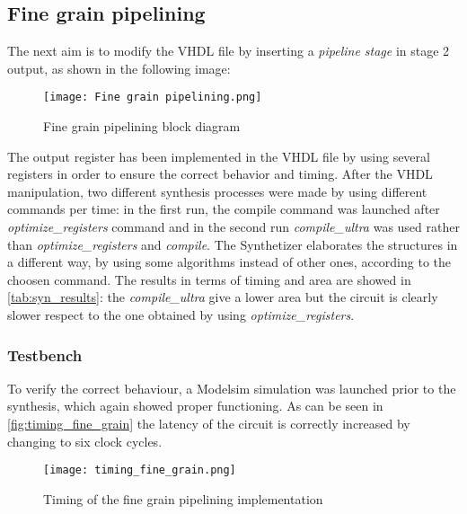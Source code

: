 
\subsection{Fine grain pipelining}
The next aim is to modify the VHDL file by inserting a \textit{pipeline stage} in stage 2 output, as shown in the following image:
\begin{figure}[htb]
	\center
	\texttt{[image: Fine grain pipelining.png]}
	\caption{Fine grain pipelining block diagram}
	\label{fig:fine_pipe}
\end{figure}
The output register has been implemented in the VHDL file by using several registers in order to ensure the correct behavior and timing.  After the VHDL manipulation, two different synthesis processes were made by using different commands per time: in the first run, the compile command was launched after \textit{optimize\_registers} command and in the second run  \textit{compile\_ultra} was used rather than \textit{optimize\_registers} and \textit{compile}. The Synthetizer elaborates the structures in a different way, by using some algorithms instead of other ones, according to the choosen command. The results in terms of timing and area are showed in \autoref{tab:syn_results}: the \textit{compile\_ultra} give a lower area but the circuit is clearly slower respect to the one obtained by using \textit{optimize\_registers}.

\subsubsection{Testbench}
To verify the correct behaviour, a Modelsim simulation was launched prior to the synthesis, which again showed proper functioning. As can be seen in \autoref{fig:timing_fine_grain} the latency of the circuit is correctly increased by changing to six clock cycles.

\begin{figure}[h]
	\center
	\texttt{[image: timing\_fine\_grain.png]}
	\caption{Timing of the fine grain pipelining implementation}
	\label{fig:timing_fine_grain}
\end{figure}


